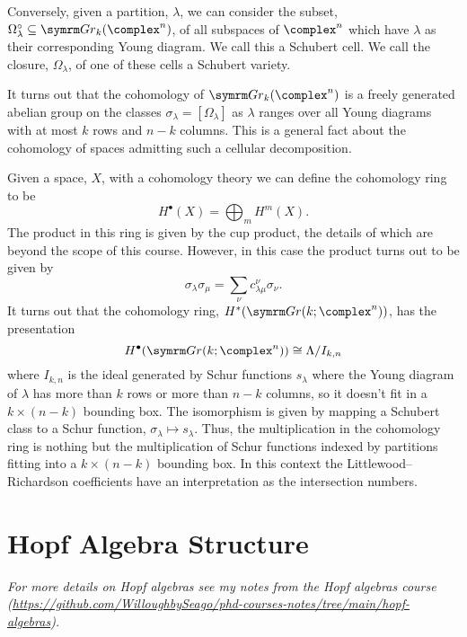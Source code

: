 Conversely, given a partition, \(\lambda\), we can consider the subset, \(\Omega_\lambda^{\circ} \subseteq \Gr_k(\complex^n)\), of all subspaces of \(\complex^n\) which have \(\lambda\) as their corresponding Young diagram.
We call this a Schubert cell.
We call the closure, \(\Omega_\lambda\), of one of these cells a Schubert variety.

It turns out that the cohomology of \(\Gr_k(\complex^n)\) is a freely generated abelian group on the classes \(\sigma_\lambda = [\Omega_\lambda]\) as \(\lambda\) ranges over all Young diagrams with at most \(k\) rows and \(n - k\) columns.
This is a general fact about the cohomology of spaces admitting such a cellular decomposition.

Given a space, \(X\), with a cohomology theory we can define the cohomology ring to be
\begin{equation}
    H^{\bullet}(X) = \bigoplus_m H^m(X).
\end{equation}
The product in this ring is given by the cup product, the details of which are beyond the scope of this course.
However, in this case the product turns out to be given by
\begin{equation}
    \sigma_\lambda \sigma_\mu = \sum_\nu c^{\nu}_{\lambda\mu} \sigma_\nu.
\end{equation}
It turns out that the cohomology ring, \(H^*(\Gr(k; \complex^n))\), has the presentation
\begin{equation}
    H^{\bullet}(\Gr(k; \complex^n)) \isomorphic \Lambda / I_{k,n}
\end{equation}
where \(I_{k,n}\) is the ideal generated by Schur functions \(s_\lambda\) where the Young diagram of \(\lambda\) has more than \(k\) rows or more than \(n - k\) columns, so it doesn't fit in a \(k \times (n - k)\) bounding box.
The isomorphism is given by mapping a Schubert class to a Schur function, \(\sigma_\lambda \mapsto s_\lambda\).
Thus, the multiplication in the cohomology ring is nothing but the multiplication of Schur functions indexed by partitions fitting into a \(k \times (n - k)\) bounding box.
In this context the Littlewood--Richardson coefficients have an interpretation as the intersection numbers.

\section{Hopf Algebra Structure}
\textit{For more details on Hopf algebras see my notes from the Hopf algebras course (\url{https://github.com/WilloughbySeago/phd-courses-notes/tree/main/hopf-algebras}).}

